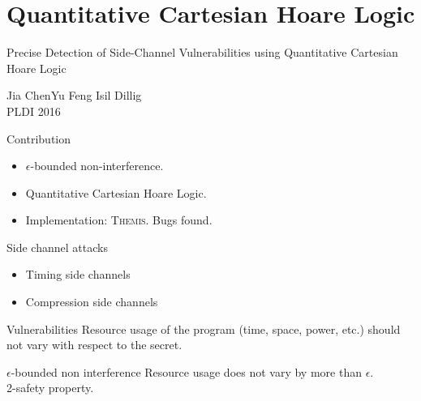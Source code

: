 \documentclass[page number]{beamer}
\begin{document}
\section{Quantitative Cartesian Hoare Logic}
\begin{frame}{Precise Detection of Side-Channel Vulnerabilities using Quantitative Cartesian Hoare Logic}
  \begin{center}
    Jia Chen\qquad Yu Feng \qquad Isil Dillig\\
    PLDI 2016
  \end{center}
  \vfill
  \begin{exampleblock}{Contribution}
    \begin{itemize}
    \item $\epsilon$-bounded non-interference.
    \item Quantitative Cartesian Hoare Logic.
    \item Implementation: \textsc{Themis}. Bugs found.
    \end{itemize}
  \end{exampleblock}
\end{frame}

\begin{frame}{Side channel attacks}
  \begin{itemize}
  \item Timing side channels
  \item Compression side channels
  \end{itemize}
  \vfill
  \begin{alertblock}{Vulnerabilities}
    Resource usage of the program (time, space, power, etc.) should not vary with respect to the secret.
  \end{alertblock}
  \vfill
  \begin{exampleblock}{$\epsilon$-bounded non interference}
    Resource usage does not vary by more than $\epsilon$.\\
    2-safety property.
  \end{exampleblock}
  
\end{frame}
\end{document}
